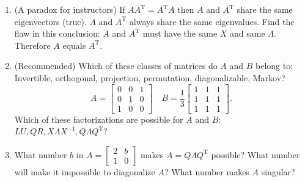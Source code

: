 \documentclass[14pt, a4paper]{article}
\begin{document}
\begin{enumerate}
    \item (A paradox for instructors) If $AA^{\mathrm{T}} = A^{\mathrm{T}}A$ then $A$ and $A^{\mathrm{T}}$ share the same eigenvectors (true). $A$ and $A^{\mathrm{T}}$ always share the same eigenvalues. Find the flaw in this conclusion: $A$ and $A^{\mathrm{T}}$ must have the same $X$ and same $\Lambda$. Therefore $A$ equals $A^{\mathrm{T}}$.

    \item (Recommended) Which of these classes of matrices do $A$ and $B$ belong to: Invertible, orthogonal, projection, permutation, diagonalizable, Markov?
          \[
              A = \begin{bmatrix} 0 & 0 & 1 \\ 0 & 1 & 0 \\ 1 & 0 & 0 \end{bmatrix} \quad B = \frac{1}{3} \begin{bmatrix} 1 & 1 & 1 \\ 1 & 1 & 1 \\ 1 & 1 & 1 \end{bmatrix} .
          \]
          Which of these factorizations are possible for $A$ and $B$: $LU, QR, X \Lambda X^{-1}, Q \Lambda Q^{\mathrm{T}}$?

    \item What number $b$ in $A = \begin{bmatrix} 2 & b \\ 1 & 0 \end{bmatrix}$ makes $A = Q \Lambda Q^{\mathrm{T}}$ possible? What number will make it impossible to diagonalize $A$? What number makes $A$ singular?
\end{enumerate}
\end{document}
